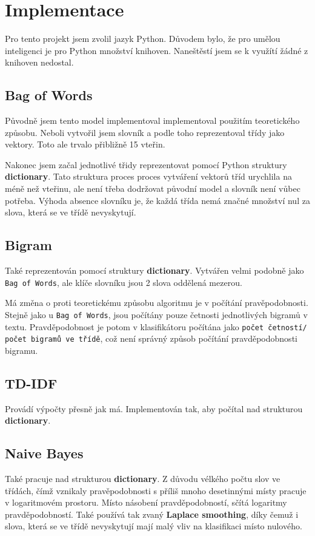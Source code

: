 \documentclass[12pt]{article}
\begin{document}
\section{Implementace}
Pro tento projekt jsem zvolil jazyk Python. Důvodem bylo,
že pro umělou inteligenci je pro Python množství knihoven.
Naneštěstí jsem se k využítí žádné z knihoven nedostal.
\subsection{Bag of Words}
Původně jsem tento model implementoval implementoval 
použitím teoretického způsobu. Neboli vytvořil jsem 
slovník a podle toho reprezentoval třídy jako vektory.
Toto ale trvalo přibližně 15 vteřin.

Nakonec jsem začal jednotlivé třidy reprezentovat pomocí
Python struktury \textbf{dictionary}. Tato struktura proces
proces vytváření vektorů tříd urychlila na méně než vteřinu,
ale není třeba dodržovat původní model a slovník není vůbec
potřeba. Výhoda absence slovníku je, že každá třída nemá
značné množství nul za slova, která se ve třídě nevyskytují.
\subsection{Bigram}
Také reprezentován pomocí struktury \textbf{dictionary}.
Vytvářen velmi podobně jako \texttt{Bag of Words}, ale 
klíče slovníku jsou 2 slova oddělená mezerou.

Má změna o proti teoretickému způsobu algoritmu je v
počítání pravěpodobnosti. Stejně jako u \texttt{Bag of Words},
jsou počítány pouze četnosti jednotlivých bigramů v textu.
Pravděpodobnost je potom v klasifikátoru počítána jako 
\texttt{počet četností/ počet bigramů ve třídě}, což není
správný způsob počítání pravděpodobnosti bigramu.
\subsection{TD-IDF}
Provádí výpočty přesně jak má. Implementován tak, aby
počítal nad strukturou \textbf{dictionary}.
\subsection{Naive Bayes}
Také pracuje nad strukturou \textbf{dictionary}. Z důvodu
vélkého počtu slov ve třídách, čímž vznikaly pravěpodobnosti
s příliš mnoho desetinnými místy pracuje v logaritmovém prostoru.
Místo násobení pravděpodobností, sčítá logaritmy pravděpodobností.
Také používá tak zvaný \textbf{Laplace smoothing}, díky čemuž
i slova, která se ve třídě nevyskytují mají malý vliv na 
klasifikaci místo nulového.
\end{document}
